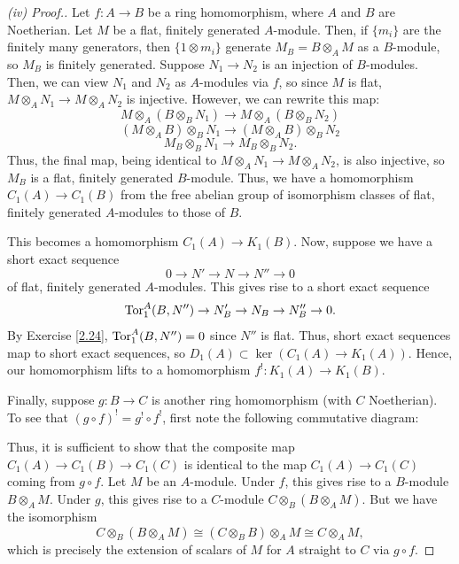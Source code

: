 \begin{proof}[(iv) Proof.]
Let $f : A \to B$ be a ring homomorphism, where $A$ and $B$ are Noetherian. Let $M$ be a flat, finitely generated $A$-module. Then, if $\{m_i\}$ are the finitely 
many generators, then $\{1 \otimes m_i\}$ generate $M_B = B \otimes_A M$ as a $B$-module, so $M_B$ is finitely generated. Suppose $N_1 \to N_2$ is an injection
of $B$-modules. Then, we can view $N_1$ and $N_2$ as $A$-modules via $f$, so since $M$ is flat, $M \otimes_A N_1 \to M \otimes_A N_2$ is injective. However, we
can rewrite this map:
$$M \otimes_A (B \otimes_B N_1) \to M \otimes_A (B \otimes_B N_2)$$
$$(M \otimes_A B) \otimes_B N_1 \to (M \otimes_A B) \otimes_B N_2$$
$$M_B \otimes_B N_1 \to M_B \otimes_B N_2.$$
Thus, the final map, being identical to $M \otimes_A N_1 \to M \otimes_A N_2$, is also injective, so $M_B$ is a flat, finitely generated $B$-module. Thus, we have a 
homomorphism $C_1(A) \to C_1(B)$ from the free abelian group of isomorphism classes of flat, finitely generated $A$-modules to those of $B$. 

This becomes a homomorphism $C_1(A) \to K_1(B)$. Now, suppose we have a short exact sequence
$$0 \to N' \to N \to N'' \to 0$$
of flat, finitely generated $A$-modules. This gives rise to a short exact sequence
$$\operatorname{Tor}_1^A(B,N'') \to N_B' \to N_B \to N_B'' \to 0.$$
By Exercise \ref{2.24}, $\operatorname{Tor}_1^A(B,N'') = 0$ since $N''$ is flat. Thus, short exact sequences map to short exact sequences, so $D_1(A) \subset \ker(C_1(A) \to K_1(A))$.
Hence, our homomorphism lifts to a homomorphism $f^! : K_1(A) \to K_1(B)$.

Finally, suppose $g : B \to C$ is another ring homomorphism (with $C$ Noetherian). To see that $(g \circ f)^! = g^! \circ f^!$, first note the following commutative
diagram:
\begin{center}
\end{center}
Thus, it is sufficient to show that the composite map $C_1(A) \to C_1(B) \to C_1(C)$ is identical to the map $C_1(A) \to C_1(C)$ coming from $g \circ f$. Let $M$ be an
$A$-module. Under $f$, this gives rise to a $B$-module $B \otimes_A M$. Under $g$, this gives rise to a $C$-module $C \otimes_B (B \otimes_A M)$. But we have the isomorphism
$$C \otimes_B (B \otimes_A M) \cong (C \otimes_B B) \otimes_A M \cong C \otimes_A M,$$
which is precisely the extension of scalars of $M$ for $A$ straight to $C$ via $g \circ f$.
\end{proof}

